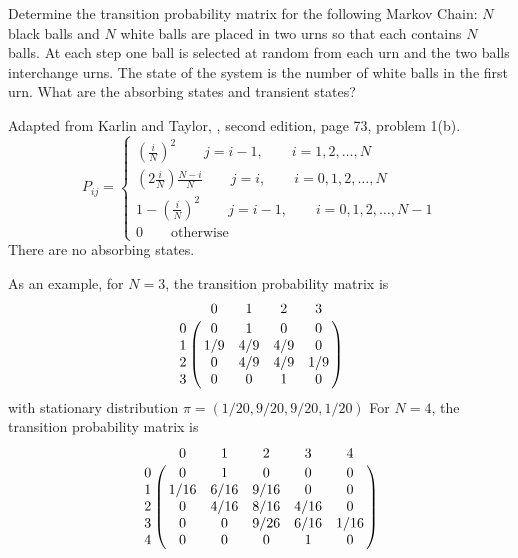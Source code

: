 \documentclass[12pt]{article}
\begin{document}
\begin{exercise}
    Determine the transition probability matrix for the following Markov
    Chain:  \( N \) black balls and \( N \) white balls are placed in
    two urns so that each contains \( N \) balls.  At each step one ball
    is selected at random from each urn and the two balls interchange
    urns.  The state of the system is the number of white balls in the
    first urn.  What are the absorbing states and transient states?

\end{exercise}
\begin{solution}
    Adapted from Karlin and Taylor, , second edition, page 73, problem 1(b).
    \[
        P_{ij} =
        \begin{cases}
            (\frac{i}{N})^2 \qquad j = i-1, \qquad i=1,2,\dots,N \\
            (2\frac{i}{N})\frac{N-i}{N} \qquad j = i, \qquad i=0,1,2,\dots,N
            \\
            1- (\frac{i}{N})^2 \qquad j = i-1, \qquad i=0,1,2,\dots,N-1
            \\
            0 \qquad \text{otherwise}
        \end{cases}
    \] There are no absorbing states.

      As an example, for \( N = 3 \), the transition probability
    matrix is
    \[
        \bordermatrix{ & 0 & 1 & 2 & 3 \cr
        0 & 0 & 1 & 0 & 0 \cr
        1 & 1/9 & 4/9 & 4/9 & 0 \cr
        2 & 0 & 4/9 & 4/9 & 1/9 \cr
        3 & 0 & 0 & 1 & 0 }
    \] with stationary distribution \( \pi = (1/20, 9/20, 9/20, 1/20) \)
    For \( N = 4 \), the transition probability matrix is
    \[
        \bordermatrix{ & 0 & 1 & 2 & 3 & 4 \cr
        0 & 0 & 1 & 0 & 0 & 0 \cr
        1 & 1/16& 6/16& 9/16& 0 & 0 \cr
        2 & 0 & 4/16& 8/16& 4/16 & 0 \cr
        3 & 0 & 0 & 9/26& 6/16 & 1/16 \cr
        4 & 0 & 0 & 0 & 1 & 0 }
    \]
\end{solution}
\end{document}
